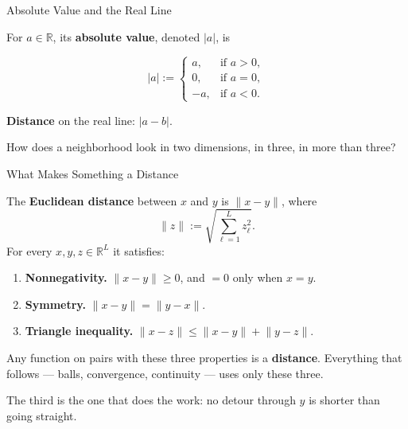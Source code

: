 \documentclass[11pt,aspectratio=169,c]{beamer}
\begin{document}
\begin{frame}{Absolute Value and the Real Line}
\begin{definitionbox}[2.2.1 Definition]
\begin{minipage}[c]{.46\linewidth}
For $a\in\mathbb{R}$, its \textbf{absolute value}, denoted $|a|$, is
\end{minipage}\hfill
\begin{minipage}[c]{.49\linewidth}
\[
|a|:=
\begin{cases}
 a,  & \text{if } a>0,\\
 0,  & \text{if } a=0,\\
 -a, & \text{if } a<0.
\end{cases}
\]
\end{minipage}
\end{definitionbox}

\vspace{.5em}
\textbf{Distance} on the real line: $|a-b|$.

\vspace{.2em}
\begin{center}
\end{center}

\vspace{.1em}
\centering How does a neighborhood look in two dimensions, in three,
in more than three?
\end{frame}

\begin{frame}{What Makes Something a Distance}
\begin{definitionbox}
The \textbf{Euclidean distance} between $x$ and $y$ is $\lVert x-y\rVert$, where
\[
\lVert z\rVert:=\sqrt{\textstyle\sum_{\ell=1}^{L}z_\ell^2}.
\]
For every $x,y,z\in\mathbb{R}^L$ it satisfies:
\begin{enumerate}
    \item \textbf{Nonnegativity.} $\lVert x-y\rVert\geq0$, and $=0$ only when $x=y$.
    \item \textbf{Symmetry.} $\lVert x-y\rVert=\lVert y-x\rVert$.
    \item \textbf{Triangle inequality.} $\lVert x-z\rVert\leq\lVert x-y\rVert+\lVert y-z\rVert$.
\end{enumerate}
\end{definitionbox}

Any function on pairs with these three properties is a \textbf{distance}.
Everything that follows --- balls, convergence, continuity --- uses only
these three.

\vspace{.35em}
\centering The third is the one that does the work: no detour through $y$ is shorter
than going straight.
\end{frame}
\end{document}
